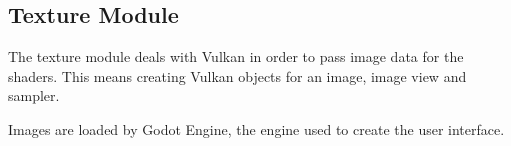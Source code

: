 \subsection{Texture Module}
The texture module deals with Vulkan in order to pass image data for the shaders. This means creating Vulkan objects for an image, image view and sampler.

Images are loaded by Godot Engine, the engine used to create the user interface.
